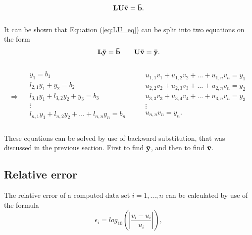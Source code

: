 \documentclass[12pt]{article}
\begin{document}
\begin{flushleft}
\begin{equation}\label{eq:LU_eq}
\bf LU \bar{v} = \bar{b}.
\end{equation}\\
\vspace{5mm}
It can be shown that Equation (\ref{eq:LU_eq}) can be split into two equations on the form\\
\begin{equation}\label{eq:LU_eq}
\bf L \bar{y} = \bar{b}\quad\quad U\bar{v} = \bar{y}.
\end{equation}\\
\vspace{5mm}
$$\Rightarrow\quad
    \begin{array}{c}
    y_{1}=b_{1}\\
    l_{2,1}y_{1} + y_{2} = b_{2}\\
    l_{3,1}y_{1} + l_{3,2}y_{2} + y_{3} = b_{3}\\
    \vdots\\
    l_{n,1}y_{1} + l_{n,2}y_{2} + \dots + l_{n,n}y_{n} = b_{n}\\       
    \end{array}
    \quad\quad
    \begin{array}{c}
    u_{1,1}v_{1} + u_{1,2}v_{2} + \dots + u_{1,n}v_{n} = y_{1}\\
    u_{2,2}v_{2} + u_{2,3}v_{3} + \dots + u_{2,n}v_{n} = y_{2}\\
    u_{3,3}v_{3} + u_{3,4}v_{4} + \dots + u_{3,n}v_{n} = y_{3}\\
    \vdots\\
    u_{n,n}v_{n} = y_{n}.\\    
    \end{array}
$$\\
 \vspace{5mm}
These equations can be solved by use of backward substitution, that was discussed in the previous section. First to find $\bf \bar{y}$, and then to find $\bf \bar{v}$.

\subsection*{Relative error}
The relative error of a computed data set $i = 1,...,n$ can be calculated by use of the formula\\

\begin{equation}\label{eq:relative_error}
\epsilon_{i} = log_{10}\left(\left|\frac{v_i - u_i}{u_i}\right|\right),
\end{equation}
\vspace{5mm}


\end{flushleft}
\end{document}

